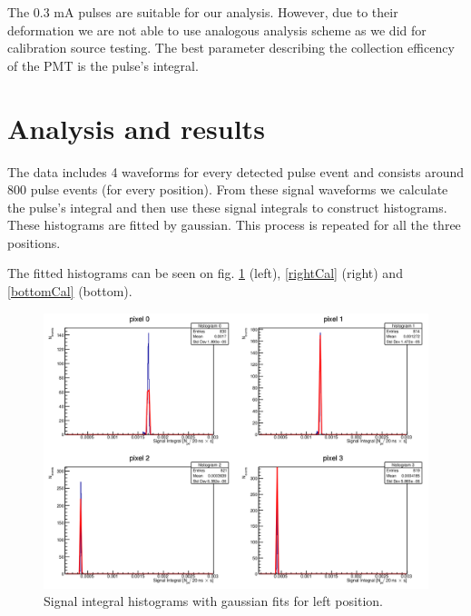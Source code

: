 \par
The 0.3 mA pulses are suitable for our analysis. However, due to their deformation we are not able to use analogous analysis scheme as we did for calibration source testing. The best parameter describing the collection efficency of the PMT is the pulse's integral. 


\section{Analysis and results}
The data includes 4 waveforms for every detected pulse event and consists around 800 pulse events (for every position). From these signal waveforms we calculate the pulse's integral and then use these signal integrals to construct histograms. These histograms are fitted by gaussian. This process is repeated for all the three positions.
\par
The fitted histograms can be seen on fig. \ref{leftCal} (left), \ref{rightCal} (right) and \ref{bottomCal} (bottom).
\begin{figure}[H]
 \centering
 \includegraphics[scale=0.35, angle = 0]{./pictures/left.png}
 \caption{Signal integral histograms with gaussian fits for left position.}
 \label{leftCal}
 
\end{figure}
